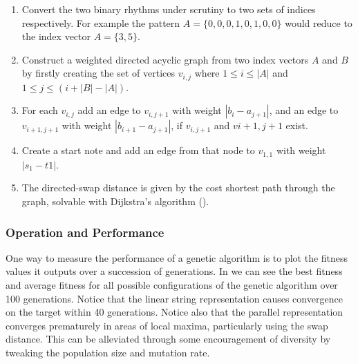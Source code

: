 \begin{enumerate}
  \item Convert the two binary rhythms under scrutiny to two sets of indices respectively. For example the pattern $A = \{0, 0, 0, 1, 0, 1, 0, 0\}$ would reduce to the index vector $A = \{3, 5\}$.
  \item Construct a weighted directed acyclic graph from two index vectors $A$ and $B$ by firstly creating the set of vertices $v_{i,j}$ where $1 \leq i \leq |A|$ and $1 \leq j \leq (i+|B|-|A|)$.
  \item For each $v_{i,j}$ add an edge to $v_{i, j+1}$ with weight $|b_{i}-a_{j+1}|$, and an edge to $v_{i+1, j+1}$ with weight $|b_{i+1}-a_{j+1}|$, if $v_{i, j+1}$ and $v{i+1, j+1}$ exist.
  \item Create a start note and add an edge from that node to $v_{1,1}$ with weight $|s_{1}-t{1}|$.
  \item The directed-swap distance is given by the cost shortest path through the graph, solvable with Dijkstra's algorithm ().
\end{enumerate}

\subsubsection{Operation and Performance}

One way to measure the performance of a genetic algorithm is to plot the fitness values it outputs over a succession of generations. In  we can see the best fitness and average fitness for all possible configurations of the genetic algorithm over 100 generations. Notice that the linear string representation causes convergence on the target within 40 generations. Notice also that the parallel representation converges prematurely in areas of local maxima, particularly using the swap distance. This can be alleviated through some encouragement of diversity by tweaking the population size and mutation rate.

